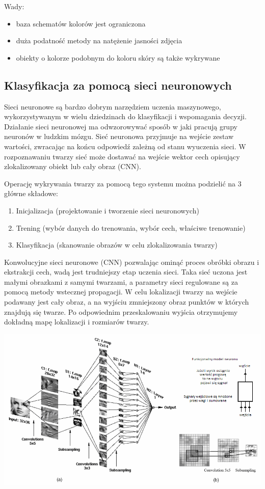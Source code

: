 \documentclass[11pt,a4paper]{article}
\begin{document}
\noindent Wady:
\begin{itemize}
\item baza schematów kolorów jest ograniczona
\item duża podatność metody na natężenie jasności zdjęcia
\item obiekty o kolorze podobnym do koloru skóry są także wykrywane
\end{itemize}

\subsection{Klasyfikacja za pomocą sieci neuronowych}

Sieci neuronowe są bardzo dobrym narzędziem uczenia maszynowego, wykorzystywanym w wielu dziedzinach do klasyfikacji i wspomagania decyzji. Działanie sieci neuronowej ma odwzorowywać sposób w jaki pracują grupy neuronów w ludzkim mózgu. Sieć neuronowa przyjmuje na wejście zestaw wartości, zwracając na końcu odpowiedź zależną od stanu wyuczenia sieci. W rozpoznawaniu twarzy sieć może dostawać na wejście wektor cech opisujący zlokalizowany obiekt lub cały obraz (CNN).

Operację wykrywania twarzy za pomocą tego systemu można podzielić na 3 główne składowe:
\begin{enumerate}
\item Inicjalizacja (projektowanie i tworzenie sieci neuronowych)
\item Trening (wybór danych do trenowania, wybór cech, właściwe trenowanie)
\item Klasyfikacja (skanowanie obrazów w celu zlokalizowania twarzy)
\end{enumerate}

\noindent 
Konwolucyjne sieci neuronowe (CNN) pozwalając ominąć proces obróbki obrazu i ekstrakcji cech, wadą jest trudniejszy etap uczenia sieci. Taka sieć uczona jest małymi obrazkami z samymi twarzami, a parametry sieci regulowane są za pomocą metody wstecznej propagacji. W celu lokalizacji twarzy na wejście podawany jest cały obraz, a na wyjściu zmniejszony obraz punktów w których znajdują się twarze. Po odpowiednim przeskalowaniu wyjścia otrzymujemy dokładną mapę lokalizacji i rozmiarów twarzy.

\vspace*{1cm}
\includegraphics[scale=0.65]{cnn.png}
\vspace*{1cm}
\end{document}

